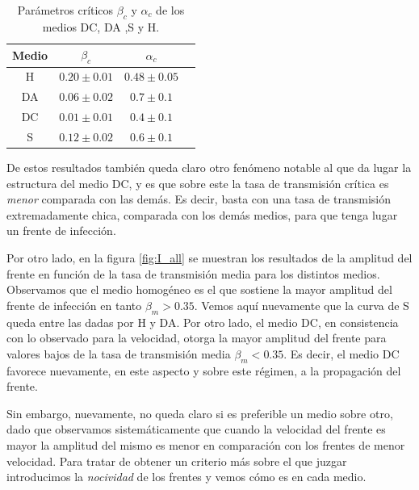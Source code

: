 \begin{table}[t]
    \centering
    \caption{Parámetros críticos $\beta_c$ y $\alpha_c$ de los medios DC, DA ,S y H.}
    \label{tab:pc}
    \begin{tabular}{@{}cccc@{}}
    \toprule
    Medio & $\beta_c$     & $\alpha_c$    \\ \midrule
    H     & $0.20\pm0.01$ & $0.48\pm0.05$ \\
    DA    & $0.06\pm0.02$ & $0.7\pm0.1$ \\
    DC    & $0.01\pm0.01$ & $0.4\pm0.1$ \\
    S     & $0.12\pm0.02$ & $0.6\pm0.1$ \\ \bottomrule
    \end{tabular}
\end{table}

De estos resultados también queda claro otro fenómeno notable al que da lugar la estructura del medio DC, y es que sobre este la tasa 
de transmisión crítica es \textit{menor} comparada con las demás. Es decir, basta con una tasa de transmisión extremadamente chica, comparada con los demás medios,
para que tenga lugar un frente de infección.

Por otro lado, en la figura \ref{fig:I_all} se muestran los resultados de la amplitud del frente en función de la tasa de transmisión media para los distintos medios. Observamos que el medio homogéneo es el que sostiene la mayor amplitud del frente de infección en tanto $\beta_m > 0.35$. Vemos aquí nuevamente que la curva de S queda entre las dadas por H y DA. Por otro lado, el medio DC, en consistencia con lo observado para la velocidad, otorga la mayor amplitud del frente para valores bajos de la tasa de transmisión media $\beta_m<0.35$. Es decir, el medio DC favorece nuevamente, en este aspecto y sobre este régimen, a la propagación del frente.

Sin embargo, nuevamente, no queda claro si es preferible un medio sobre otro, dado que observamos sistemáticamente que cuando la velocidad del frente es mayor la amplitud del mismo es menor en comparación con los frentes de menor velocidad. Para tratar de obtener un criterio más sobre el que juzgar introducimos la \textit{nocividad} de los frentes y vemos cómo es en cada medio.

